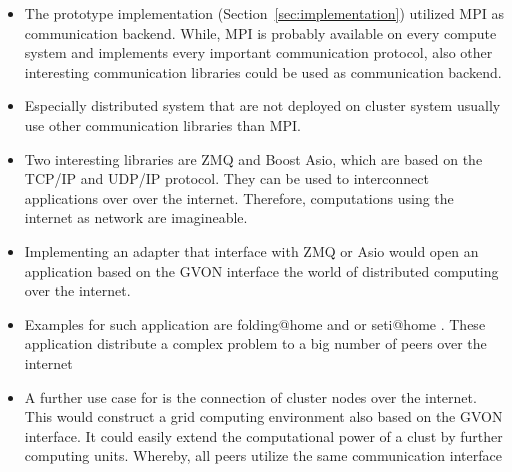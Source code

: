 \begin{itemize}
\item The prototype implementation
  (Section~\ref{sec:implementation}) utilized MPI as communication
  backend. While, MPI is probably available on every compute system
  and implements every important communication protocol, also other
  interesting communication libraries could be used as communication
  backend.

\item Especially distributed system that are not deployed on cluster
  system usually use other communication libraries than MPI.

\item Two interesting libraries are ZMQ and Boost Asio, which are
  based on the TCP/IP and UDP/IP protocol. They can be used to
  interconnect applications over over the internet. Therefore,
  computations using the internet as network are imagineable.

\item Implementing an adapter that interface with ZMQ or Asio would
  open an application based on the GVON interface the world of
  distributed computing over the internet.
  
\item Examples for such application are folding@home
  \cite{ref:folding_at_home} and or seti@home
  \cite{ref:seti_at_home}. These application distribute a complex
  problem to a big number of peers over the internet


\item A further use case for is the connection of cluster nodes over
  the internet. This would construct a grid computing environment also
  based on the GVON interface. It could easily extend the
  computational power of a clust by further computing units. Whereby,
  all peers utilize the same communication interface


\end{itemize}
